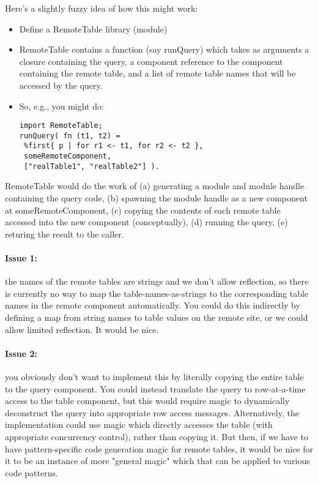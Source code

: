 Here's a slightly fuzzy idea of how this might work:
\begin{itemize}\renewcommand{\labelitemi}{--}
\item Define a RemoteTable library (module)
\item RemoteTable contains a function (say runQuery) which takes as arguments a closure containing the query, a component reference to the component containing the remote table, and a list of remote table names that will be accessed by the query.
\item So, e.g., you might do: 
\begin{lstlisting}
import RemoteTable; 
runQuery( fn (t1, t2) = 
 %first{ p | for r1 <- t1, for r2 <- t2 }, 
 someRemoteComponent, 
 ["realTable1", "realTable2"] ).
\end{lstlisting}
\end{itemize}
RemoteTable would do the work of (a) generating a module and module handle containing the query code, (b) spawning the module handle as a new component at someRemoteComponent, (c) copying the contents of each remote table accessed into the new component (conceptually), (d) running the query, (e) returing the result to the caller.

\paragraph{Issue 1:} the names of the remote tables are strings and we don't allow reflection, so there is currently no way to map the table-names-as-strings to the corresponding table names in the remote component automatically.  You could do this indirectly by defining a map from string names to table values on the remote site, or we could allow limited reflection.  It would be nice.
 
\paragraph{Issue 2:} you obviously don't want to implement this by literally copying the entire table to the query component.  You could instead translate the query to row-at-a-time access to the table component, but this would require magic to dynamically deconstruct the query into appropriate row access messages.  Alternatively, the implementation could use magic which directly accesses the table (with appropriate concurrency control), rather than copying it.  But then, if we have to have pattern-specific code generation magic for remote tables, it would be nice for it to be an instance of more "general magic" which that can be applied to various code patterns.

